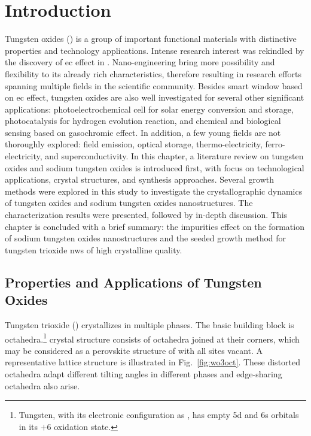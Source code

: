 \section{Introduction}
Tungsten oxides () is a group of important functional materials with distinctive properties and technology applications. Intense research interest was rekindled by the discovery of \gls{ec} effect in \citeyear{Granqvist1993}.\cite{Granqvist1993}  Nano-engineering  bring more possibility and flexibility to its already rich characteristics, therefore resulting in research efforts spanning multiple fields in the scientific community. Besides smart window based on \gls{ec} effect, tungsten oxides are also well investigated for several other significant applications: photoelectrochemical cell for solar energy conversion and storage, photocatalysis for hydrogen evolution reaction, and chemical and biological sensing based on gasochromic effect. In addition, a few young fields are not thoroughly explored: field emission, optical storage, thermo-electricity, ferro-electricity, and superconductivity. In this chapter, a literature review on tungsten oxides and sodium tungsten oxides is introduced first, with focus on technological applications, crystal structures, and synthesis approaches. Several growth methods were explored in this study to investigate the crystallographic dynamics of tungsten oxides and sodium tungsten oxides nanostructures. The characterization results were presented, followed by in-depth discussion. This chapter is concluded with a brief summary: the impurities effect on the formation of sodium tungsten oxides nanostructures and the seeded growth method for tungsten trioxide \glspl{nw} of high crystalline quality.

\subsection{Properties and Applications of Tungsten Oxides}\label{sec:wonawo}
Tungsten trioxide () crystallizes in multiple phases. The basic building block is  octahedra.\footnote{Tungsten, with its electronic configuration as , has empty 5d and 6s orbitals in its $+6$ oxidation state.}  crystal structure consists of  octahedra joined at their corners, which may be considered as a perovskite structure of  with all  sites vacant. A representative lattice structure is illustrated in Fig.~\ref{fig:wo3oct}. These distorted  octahedra adapt different tilting angles in different phases and edge-sharing octahedra also arise. 

